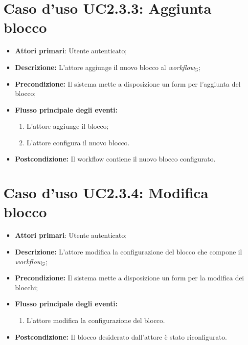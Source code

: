 		\section{Caso d'uso UC2.3.3: Aggiunta blocco }
		\begin{itemize}
			\item \textbf{Attori primari}: Utente autenticato;
			\item \textbf{Descrizione:} L'attore aggiunge il nuovo blocco al \textit{workflow$_{G}$};
			\item \textbf{Precondizione:} Il sistema mette a disposizione un form per l'aggiunta del blocco;
			\item \textbf{Flusso principale degli eventi:}
			\begin{enumerate}
				\item L'attore aggiunge il blocco;
				\item L'attore configura il nuovo blocco.
			\end{enumerate}
			\item \textbf{Postcondizione:} Il workflow contiene il nuovo blocco configurato.
		\end{itemize}
		\section{Caso d'uso UC2.3.4: Modifica blocco }
		\begin{itemize}
			\item \textbf{Attori primari}: Utente autenticato;
			\item \textbf{Descrizione:} L'attore modifica la configurazione del blocco che compone il \textit{workflow$_{G}$};
			\item \textbf{Precondizione:} Il sistema mette a disposizione un form per la modifica dei blocchi;
			\item \textbf{Flusso principale degli eventi:}
			\begin{enumerate}
				\item L'attore modifica la configurazione del blocco.
			\end{enumerate}
			\item \textbf{Postcondizione:} Il blocco desiderato dall'attore è stato riconfigurato.
		\end{itemize}

